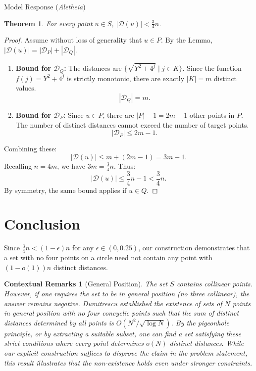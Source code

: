 \documentclass[11pt]{article}
\newtheorem{theorem}{Theorem}
\newtheorem*{remark}{Contextual Remarks}
\begin{document}
\begin{solution}{Model Response (\emph{Aletheia})}
\begin{theorem}
For every point $u \in S$, $|\mathcal{D}(u)| < \frac{3}{4}n$.
\end{theorem}

\begin{proof}
Assume without loss of generality that $u \in P$.
By the Lemma, $|\mathcal{D}(u)| = |\mathcal{D}_P| + |\mathcal{D}_Q|$.
\begin{enumerate}
    \item \textbf{Bound for $\mathcal{D}_Q$:}
    The distances are $\{\sqrt{Y^2 + 4^j} \mid j \in K\}$. Since the function $f(j) = Y^2 + 4^j$ is strictly monotonic, there are exactly $|K| = m$ distinct values.
    \[ |\mathcal{D}_Q| = m. \]
    \item \textbf{Bound for $\mathcal{D}_P$:}
    Since $u \in P$, there are $|P|-1 = 2m-1$ other points in $P$. The number of distinct distances cannot exceed the number of target points.
    \[ |\mathcal{D}_P| \le 2m-1. \]
\end{enumerate}
Combining these:
\[
|\mathcal{D}(u)| \le m + (2m-1) = 3m - 1.
\]
Recalling $n = 4m$, we have $3m = \frac{3}{4}n$. Thus:
\[
|\mathcal{D}(u)| \le \frac{3}{4}n - 1 < \frac{3}{4}n.
\]
By symmetry, the same bound applies if $u \in Q$.
\end{proof}

\section{Conclusion}

Since $\frac{3}{4}n < (1-\epsilon)n$ for any $\epsilon \in (0, 0.25)$, our construction demonstrates that a set with no four points on a circle need not contain any point with $(1-o(1))n$ distinct distances.

\begin{remark}[General Position]
The set $S$ contains collinear points. However, if one requires the set to be in \textit{general position} (no three collinear), the answer remains negative. Dumitrescu \cite{Dumitrescu2008} established the existence of sets of $N$ points in general position with no four concyclic points such that the sum of distinct distances determined by all points is $O(N^2 / \sqrt{\log N})$. By the pigeonhole principle, or by extracting a suitable subset, one can find a set satisfying these strict conditions where \textit{every} point determines $o(N)$ distinct distances. While our explicit construction suffices to disprove the claim in the problem statement, this result illustrates that the non-existence holds even under stronger constraints.
\end{remark}


\end{solution}
\end{document}
